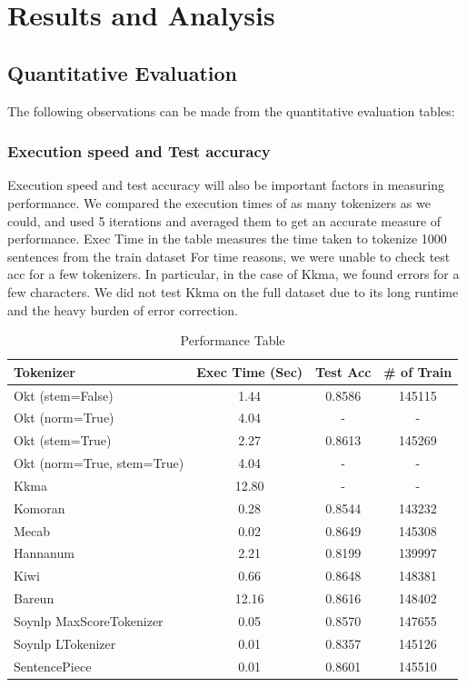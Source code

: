 \documentclass{article}
\begin{document}
\section{Results and Analysis}

\subsection{Quantitative Evaluation}
The following observations can be made from the quantitative evaluation tables:


\subsubsection{Execution speed and Test accuracy}
Execution speed and test accuracy will also be important factors in measuring performance.
We compared the execution times of as many tokenizers as we could, and used 5 iterations and averaged them to get an accurate measure of performance.
Exec Time in the table measures the time taken to tokenize 1000 sentences from the train dataset
For time reasons, we were unable to check test acc for a few tokenizers.
In particular, in the case of Kkma, we found errors for a few characters.
We did not test Kkma on the full dataset due to its long runtime and the heavy burden of error correction.


\begin{table}[h]
    \centering
    \begin{tabular}{|l|c|c|c|}
        \hline
        Tokenizer & Exec Time (Sec) & Test Acc & \# of Train \\
        \hline
        Okt (stem=False) & 1.44 & 0.8586 & 145115 \\
        Okt (norm=True) & 4.04 & - & - \\
        Okt (stem=True) & 2.27 & 0.8613 & 145269 \\
        Okt (norm=True, stem=True) & 4.04 & - & - \\
        Kkma & 12.80 & - & - \\
        Komoran & 0.28 & 0.8544 & 143232 \\
        Mecab & 0.02 & 0.8649 & 145308 \\
        Hannanum & 2.21 & 0.8199 & 139997 \\
        Kiwi & 0.66 & 0.8648 & 148381 \\
        Bareun & 12.16 & 0.8616 & 148402 \\
        Soynlp MaxScoreTokenizer & 0.05 & 0.8570 & 147655 \\
        Soynlp LTokenizer & 0.01 & 0.8357 & 145126 \\
        SentencePiece & 0.01 & 0.8601 & 145510 \\
        \hline
    \end{tabular}
    \caption{Performance Table}
\end{table}
\end{document}

